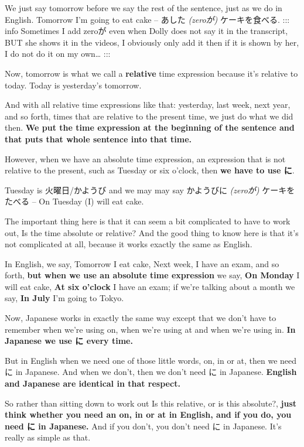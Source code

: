 \stopsectionlevel

\startsectionlevel[title={Time expressions},reference={time-expressions}]

We just say tomorrow before we say the rest of the sentence, just as we do in English. Tomorrow I'm going to eat cake -- あした {\em (zeroが)} ケーキを食べる.\crlf
::: info Sometimes I add zeroが even when Dolly does not say it in the transcript, BUT she shows it in the videos, I obviously only add it then if it is shown by her, I do not do it on my own\ldots{} :::

Now, tomorrow is what we call a {\bf relative} time expression because it's relative to today. Today is yesterday's tomorrow.

{}

And with all relative time expressions like that: yesterday, last week, next year, and so forth, times that are relative to the present time, we just do what we did then. {\bf We put the time expression at the beginning of the sentence and that puts that whole sentence into that time.}

\thinrule

However, when we have an absolute time expression, an expression that is not relative to the present, such as Tuesday or six o'clock, then {\bf we have to use に}.

Tuesday is 火曜日/かようび and we may may say かようびに {\em (zeroが)} ケーキをたべる -- On Tuesday (I) will eat cake.

{}

The important thing here is that it can seem a bit complicated to have to work out, Is the time absolute or relative? And the good thing to know here is that it's not complicated at all, because it works exactly the same as English.

In English, we say, Tomorrow I eat cake, Next week, I have an exam, and so forth, {\bf but when we use an absolute time expression} we say, {\bf On Monday} I will eat cake, {\bf At six o'clock} I have an exam; if we're talking about a month we say, {\bf In July} I'm going to Tokyo.

Now, Japanese works in exactly the same way except that we don't have to remember when we're using on, when we're using at and when we're using in. {\bf In Japanese we use に every time.}

But in English when we need one of those little words, on, in or at, then we need に in Japanese. And when we don't, then we don't need に in Japanese. {\bf English and Japanese are identical in that respect.}

{}

So rather than sitting down to work out Is this relative, or is this absolute?, {\bf just think whether you need an on, in or at in English, and if you do, you need に in Japanese.} And if you don't, you don't need に in Japanese. It's really as simple as that.

\stopsectionlevel

\stopsectionlevel
